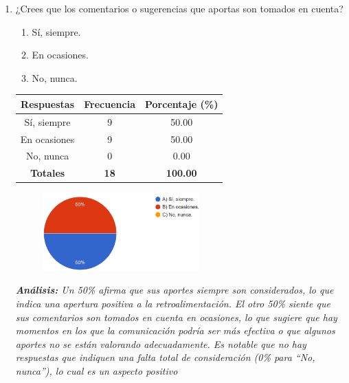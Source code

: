 \documentclass[journal]{IEEEtran}
\begin{document}
\begin{enumerate}
	\item ¿Crees que los comentarios o sugerencias que aportas son tomados en cuenta?
	\begin{enumerate}
		\item Sí, siempre.
		\item En ocasiones.
		\item No, nunca.
	\end{enumerate}
	\begin{table}[H]
		\renewcommand{\arraystretch}{1.3}
		\centering
		\begin{tabular}{|c|c|c|}
			\hline
			\textbf{Respuestas} & \textbf{Frecuencia} & \textbf{Porcentaje (\%)}\\
			\hline
			Sí, siempre & 9 & 50.00\\
			En ocasiones & 9 & 50.00\\
			No, nunca & 0 & 0.00\\
			\hline
			\textbf{Totales} &\textbf{18}& \textbf{100.00}\\
			\hline
		\end{tabular}
	\end{table}
	\begin{figure}[h]
		\centering
		\includegraphics[width=06cm]{Pregunta15}
	\end{figure}
	\textit{\textbf{Análisis:} Un 50\% afirma que sus aportes siempre son considerados, lo que indica una apertura positiva a la retroalimentación. El otro 50\% siente que sus comentarios son tomados en cuenta en ocasiones, lo que sugiere que hay momentos en los que la comunicación podría ser más efectiva o que algunos aportes no se están valorando adecuadamente. Es notable que no hay respuestas que indiquen una falta total de consideración (0\% para “No, nunca”), lo cual es un aspecto positivo}\\


\end{enumerate}
\end{document}
